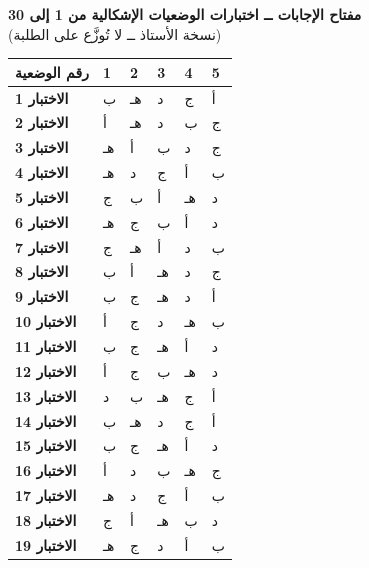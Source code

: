 \documentclass[11pt,a4paper]{article}
\begin{document}
\begin{center}
{\Large\khatt\textbf{مفتاح الإجابات ــ اختبارات الوضعيات الإشكالية من 1 إلى 30}}\\[4pt]
{\small (نسخة الأستاذ ــ لا تُوزَّع على الطلبة)}\\[10pt]
\renewcommand{\arraystretch}{1.45}
\begin{tabular}{|>{\centering\arraybackslash}m{3.2cm}|*{5}{>{\centering\arraybackslash}m{1.4cm}|}}
\hline
\textbf{رقم الوضعية} & \textbf{1} & \textbf{2} & \textbf{3} & \textbf{4} & \textbf{5} \\ \hline\hline
\rowcolor{red!14}\textbf{الاختبار 1} & ب & هـ & د & ج & أ \\ \hline
\rowcolor{orange!18}\textbf{الاختبار 2} & أ & هـ & د & ب & ج \\ \hline
\rowcolor{yellow!25}\textbf{الاختبار 3} & هـ & أ & ب & د & ج \\ \hline
\rowcolor{lime!22}\textbf{الاختبار 4} & هـ & د & ج & أ & ب \\ \hline
\rowcolor{green!16}\textbf{الاختبار 5} & ج & ب & أ & هـ & د \\ \hline
\rowcolor{teal!16}\textbf{الاختبار 6} & هـ & ج & ب & أ & د \\ \hline
\rowcolor{cyan!16}\textbf{الاختبار 7} & ج & هـ & أ & د & ب \\ \hline
\rowcolor{blue!12}\textbf{الاختبار 8} & ب & أ & هـ & د & ج \\ \hline
\rowcolor{violet!14}\textbf{الاختبار 9} & ب & ج & هـ & د & أ \\ \hline
\rowcolor{purple!14}\textbf{الاختبار 10} & أ & ج & د & هـ & ب \\ \hline
\rowcolor{magenta!14}\textbf{الاختبار 11} & ب & ج & هـ & أ & د \\ \hline
\rowcolor{brown!18}\textbf{الاختبار 12} & أ & ج & ب & هـ & د \\ \hline
\rowcolor{gray!18}\textbf{الاختبار 13} & د & ب & هـ & ج & أ \\ \hline
\rowcolor{olive!18}\textbf{الاختبار 14} & ب & هـ & د & ج & أ \\ \hline
\rowcolor{red!14}\textbf{الاختبار 15} & ب & ج & هـ & أ & د \\ \hline
\rowcolor{orange!18}\textbf{الاختبار 16} & أ & د & ب & هـ & ج \\ \hline
\rowcolor{yellow!25}\textbf{الاختبار 17} & هـ & د & ج & أ & ب \\ \hline
\rowcolor{lime!22}\textbf{الاختبار 18} & ج & أ & هـ & ب & د \\ \hline
\rowcolor{green!16}\textbf{الاختبار 19} & هـ & ج & د & أ & ب \\ \hline

\end{tabular}
\end{center}
\end{document}
